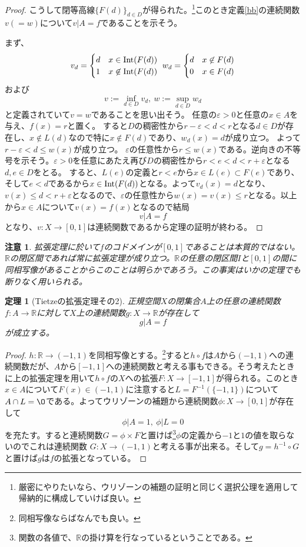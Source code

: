 \documentclass[leqno]{jsarticle}
\newtheorem{thm}{定理}
\newtheorem*{cau}{注意}
\newcommand{\rr}{\mathbb{R}}
\newcommand{\ep}{\varepsilon}
\newcommand{\nai}{\text{{\rm Int}} }
\begin{document}
\begin{proof}
こうして閉等高線$\{F(d)\}_{d\in D}$が得られた。\footnote{厳密にやりたいなら、ウリゾーンの補題の証明と同じく選択公理を適用して帰納的に構成していけば良い。}このとき定義\ref{bb}の連続関数$v(=w)$について$v|A=f$であることを示そう。\par
まず、\[
v_d=\begin{cases}
 d & \text{$x\in \nai(F(d))$} \\
 1 & \text{$x\not\in \nai(F(d))$}
\end{cases}\ 
w_d=\begin{cases}
 d & \text{$x\not\in F(d)$} \\
 0 & \text{$x\in F(d)$}
\end{cases}
\]
および
\[
v:=\inf_{d\in D}v_d,\ 
w:=\sup_{d\in D}w_d
\]
と定義されていて$v=w$であることを思い出そう。
任意の$\ep>0$と任意の$x\in A$を与え、$f(x)=r$と置く。
すると$D$の稠密性から$r-\ep <d<r$となる$d\in D$が存在し、$x\not\in L(d)$なので特に$x\not\in F(d)$であり、$w_d(x)=d$が成り立つ。
よって$r-\ep<d\le w(x)$が成り立つ。
$\ep$の任意性から$r\le w(x)$である。逆向きの不等号を示そう。$\ep>0$を任意にあたえ再び$D$の稠密性から$r<e<d<r+\ep$となる$d,e\in D$をとる。
すると、$L(e)$の定義と$r<e$から$x\in L(e)\subset  F(e)$であり、そして$e<d$であるから$x\in \nai(F(d))$となる。よって$v_d(x)=d$となり、
$v(x)\le d<r+\ep$となるので、$\ep$の任意性から$w(x)=v(x)\le r$となる。以上から$x\in A$について$v(x)=f(x)$となるので結局
\[
v|A=f
\]
となり、$v:X\to [0,1]$は連続関数であるから定理の証明が終わる。
\end{proof}
\begin{cau}
拡張定理に於いて$f$のコドメインが$[0,1]$であることは本質的ではない。$\rr$の閉区間であれば常に拡張定理が成り立つ。$\rr$の任意の閉区間$I$と$[0,1]$の間に同相写像があることからこのことは明らかであろう。この事実はいかの定理でも断りなく用いられる。
\end{cau}
\begin{thm}[Tietzeの拡張定理その2]
正規空間$X$の閉集合$A$上の任意の連続関数$f:A\to \rr$に対して$X$上の連続関数$g:X\to \rr$が存在して
\[
g|A=f
\]
が成立する。
\end{thm}
\begin{proof}
$h:\rr\to (-1,1)$を同相写像とする。\footnote{同相写像ならばなんでも良い。}すると$h\circ f$は$A$から$(-1,1)$への連続関数だが、$A$から$[-1,1]$への連続関数と考える事もできる。そう考えたときに上の拡張定理を用いて$h\circ f$の$X$への拡張$F:X\to [-1,1]$が得られる。このとき$x\in A$について$F(x)\in (-1,1)$に注意すると$L=F^{-1}(\{-1,1\})$について$A\cap L=\O$である。よってウリゾーンの補題から連続関数$\phi:X\to [0,1]$が存在して
\[
\phi|A=1,\ \phi|L=0
\]
を充たす。すると連続関数$G=\phi \times F$と置けば\footnote{関数の各値で、$\rr$の掛け算を行なっているということである。}$\phi$の定義から$-1$と$1$の値を取らないのでこれは連続関数
$G:X\to (-1,1)$と考える事が出来る。そして$g=h^{-1}\circ G$と置けば$g$は$f$の拡張となっている。
\end{proof}
\end{document}
